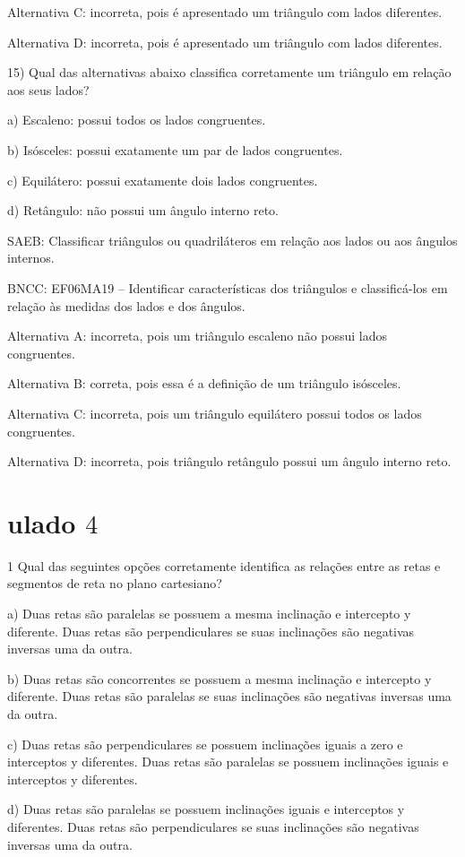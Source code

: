 Alternativa C: incorreta, pois é apresentado um triângulo com lados
diferentes.

Alternativa D: incorreta, pois é apresentado um triângulo com lados
diferentes.

15) Qual das alternativas abaixo classifica corretamente um triângulo em
relação aos seus lados?

a) Escaleno: possui todos os lados congruentes.

b) Isósceles: possui exatamente um par de lados congruentes.

c) Equilátero: possui exatamente dois lados congruentes.

d) Retângulo: não possui um ângulo interno reto.

SAEB: Classificar triângulos ou quadriláteros em relação aos lados ou
aos ângulos internos.

BNCC: EF06MA19 -- Identificar características dos triângulos e
classificá-los em relação às medidas dos lados e dos ângulos.

Alternativa A: incorreta, pois um triângulo escaleno não possui lados
congruentes.

Alternativa B: correta, pois essa é a definição de um triângulo
isósceles.

Alternativa C: incorreta, pois um triângulo equilátero possui todos os
lados congruentes.

Alternativa D: incorreta, pois triângulo retângulo possui um ângulo
interno reto.

\chapter{ulado $4$}

\num{1}  Qual das seguintes opções corretamente identifica as relações entre
as retas e segmentos de reta no plano cartesiano?

a) Duas retas são paralelas se possuem a mesma inclinação e intercepto y
diferente. Duas retas são perpendiculares se suas inclinações são
negativas inversas uma da outra.

b) Duas retas são concorrentes se possuem a mesma inclinação e
intercepto y diferente. Duas retas são paralelas se suas inclinações são
negativas inversas uma da outra.

c) Duas retas são perpendiculares se possuem inclinações iguais a zero e
interceptos y diferentes. Duas retas são paralelas se possuem
inclinações iguais e interceptos y diferentes.

d) Duas retas são paralelas se possuem inclinações iguais e interceptos
y diferentes. Duas retas são perpendiculares se suas inclinações são
negativas inversas uma da outra.

